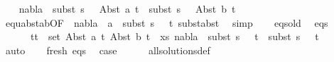 \begin{isabellebody}
\ \ \isamarkupfalse%
\ {\isachardoublequoteopen}nabla{}\ {\isasymturnstile}\ subst\ {\isacharparenleft}{\kern0pt}s{}\ {\isasymbullet}\ {\isacharbrackleft}{\kern0pt}{\isacharbrackright}{\kern0pt}{\isacharparenright}{\kern0pt}\ {\isacharparenleft}{\kern0pt}Abst\ a\ t{}{\isacharparenright}{\kern0pt}\ {\isasymapprox}\ subst\ {\isacharparenleft}{\kern0pt}s{}\ {\isasymbullet}\ {\isacharbrackleft}{\kern0pt}{\isacharbrackright}{\kern0pt}{\isacharparenright}{\kern0pt}\ {\isacharparenleft}{\kern0pt}Abst\ b\ t{}{\isacharparenright}{\kern0pt}{\isachardoublequoteclose}\isanewline
\ \ \ \ \isamarkupfalse%
\ equ{\isacharunderscore}{\kern0pt}abst{\isacharunderscore}{\kern0pt}ab{\isacharbrackleft}{\kern0pt}OF\ {}{\isacharparenleft}{\kern0pt}{}{\isacharparenright}{\kern0pt}\ {\isacartoucheopen}nabla{}\ {\isasymturnstile}\ a\ {\isasymsharp}\ subst\ {\isacharparenleft}{\kern0pt}s{}\ {\isasymbullet}\ {\isacharbrackleft}{\kern0pt}{\isacharbrackright}{\kern0pt}{\isacharparenright}{\kern0pt}\ t{}{\isacartoucheclose}{\isacharbrackright}{\kern0pt}\ subst{\isacharunderscore}{\kern0pt}abst\ \isamarkupfalse%
\ simp\isanewline
\ \ \isamarkupfalse%
\ eqs{\isacharunderscore}{\kern0pt}old\ \isamarkupfalse%
\ eqs{\isacharcolon}{\kern0pt}\isanewline
\ \ \ \ \ {\isachardoublequoteopen}{\isasymforall}\ {\isacharparenleft}{\kern0pt}t{}{\isacharcomma}{\kern0pt}t{}{\isacharparenright}{\kern0pt}\ {\isasymin}\ set\ {\isacharparenleft}{\kern0pt}{\isacharparenleft}{\kern0pt}Abst\ a\ t{}{\isacharcomma}{\kern0pt}\ Abst\ b\ t{}{\isacharparenright}{\kern0pt}\ {\isacharhash}{\kern0pt}\ xs{\isacharparenright}{\kern0pt}{\isachardot}{\kern0pt}\ nabla{}\ {\isasymturnstile}\ subst\ {\isacharparenleft}{\kern0pt}s{}\ {\isasymbullet}\ {\isacharbrackleft}{\kern0pt}{\isacharbrackright}{\kern0pt}{\isacharparenright}{\kern0pt}\ t{}\ {\isasymapprox}\ subst\ {\isacharparenleft}{\kern0pt}s{}\ {\isasymbullet}\ {\isacharbrackleft}{\kern0pt}{\isacharbrackright}{\kern0pt}{\isacharparenright}{\kern0pt}\ t{}{\isachardoublequoteclose}\isanewline
\ \ \ \ \ \isamarkupfalse%
\ auto\isanewline
\ \ \isamarkupfalse%
\ fresh\ eqs\ \isamarkupfalse%
\ {\isacharquery}{\kern0pt}case\isanewline
\ \ \ \ \isamarkupfalse%
\ all{\isacharunderscore}{\kern0pt}solutions{\isacharunderscore}{\kern0pt}def\ \isamarkupfalse%

\end{isabellebody}
